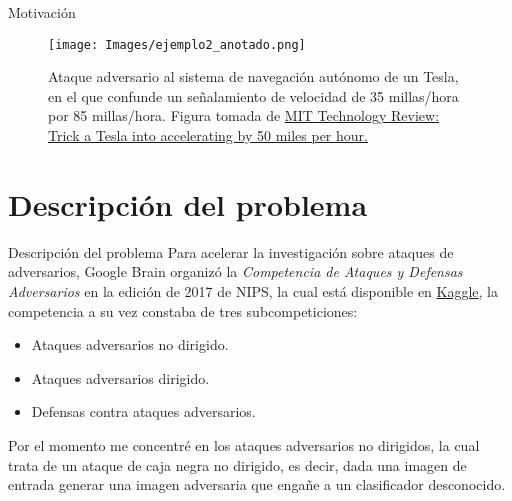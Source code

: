 \documentclass[10pt]{beamer}
\begin{document}
\begin{frame}{Motivación}
\justify
\small

\begin{figure}
\centering
\texttt{[image: Images/ejemplo2\_anotado.png]}
\caption{Ataque adversario al sistema de navegación autónomo de un Tesla, en el que confunde un señalamiento de velocidad de 35 millas/hora por 85 millas/hora. Figura tomada de \href{https://www.technologyreview.com/2020/02/19/868188/hackers-can-trick-a-tesla-into-accelerating-by-50-miles-per-hour/}{MIT Technology Review: Trick a Tesla into accelerating by 50 miles per hour.}}
\end{figure}

\end{frame}

\section{Descripción del problema}
\begin{frame}{Descripción del problema}
\justify
\small
Para acelerar la investigación sobre ataques de adversarios, Google Brain organizó la  \emph{Competencia de Ataques y Defensas Adversarios} en la edición de 2017 de NIPS, la cual está disponible en \href{https://www.kaggle.com/c/nips-2017-non-targeted-adversarial-attack/overview}{Kaggle}, la competencia a su vez constaba de tres subcompeticiones:

\begin{itemize}
\item Ataques adversarios no dirigido.
\item Ataques adversarios dirigido.
\item Defensas contra ataques adversarios.
\end{itemize}

Por el momento me concentré en los ataques adversarios no dirigidos, la cual trata de un ataque de caja negra no dirigido, es decir, dada una imagen de entrada generar una imagen adversaria que engañe a un clasificador desconocido.

\end{frame}
\end{document}
